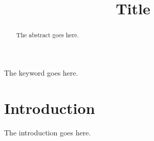 \documentclass[english]{ieej-e-samcon}
\title[Short Title]{Title}
\begin{document}
\begin{abstract}
The abstract goes here.
\end{abstract}

\begin{keyword}
The keyword goes here.
\end{keyword}

\maketitle

\section{Introduction}
The introduction goes here.



\end{document}
